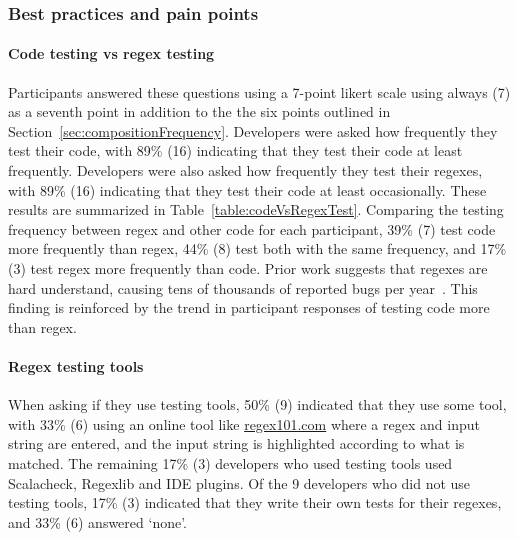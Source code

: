

\subsubsection{Best practices and pain points}
\paragraph{Code testing vs regex testing}\label{sec:surveyTesting}  Participants answered these questions using a 7-point likert scale using always (7) as a seventh point in addition to the the six points outlined in Section~\ref{sec:compositionFrequency}. Developers were asked how frequently they test their code, with 89\% (16) indicating that they test their code at least frequently.  Developers were also asked how frequently they test their regexes, with 89\% (16) indicating that they test their code at least occasionally.  These results are summarized in Table~\ref{table:codeVsRegexTest}. Comparing the testing frequency between regex and other code for each participant, 39\% (7) test code more frequently than regex, 44\% (8) test both with the same frequency, and 17\% (3) test regex more frequently than code.  Prior work suggests that regexes are hard understand, causing tens of thousands of reported bugs per year~.  This finding is reinforced by the trend in participant responses of testing code more than regex.

\paragraph{Regex testing tools} When asking if they use testing tools, 50\% (9) indicated that they use some tool, with 33\% (6) using an online tool like \url{regex101.com} where a regex and input string are entered, and the input string is highlighted according to what is matched.  The remaining 17\% (3) developers who used testing tools used Scalacheck, Regexlib and IDE plugins.
Of the 9 developers who did not use testing tools, 17\% (3) indicated that they write their own tests for their regexes, and 33\% (6) answered `none'.

